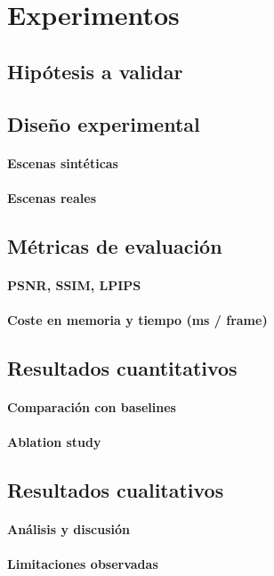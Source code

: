 \chapter{Experimentos}\label{chapter:experiments}

\section{Hipótesis a validar}

\section{Diseño experimental}
\subsubsection{Escenas sintéticas}
\subsubsection{Escenas reales}

\section{Métricas de evaluación}
\subsubsection{PSNR, SSIM, LPIPS}
\subsubsection{Coste en memoria y tiempo (ms / frame)}

\section{Resultados cuantitativos}
\subsubsection{Comparación con baselines}
\subsubsection{Ablation study}


\section{Resultados cualitativos}
\subsubsection{Análisis y discusión}
\subsubsection{Limitaciones observadas}